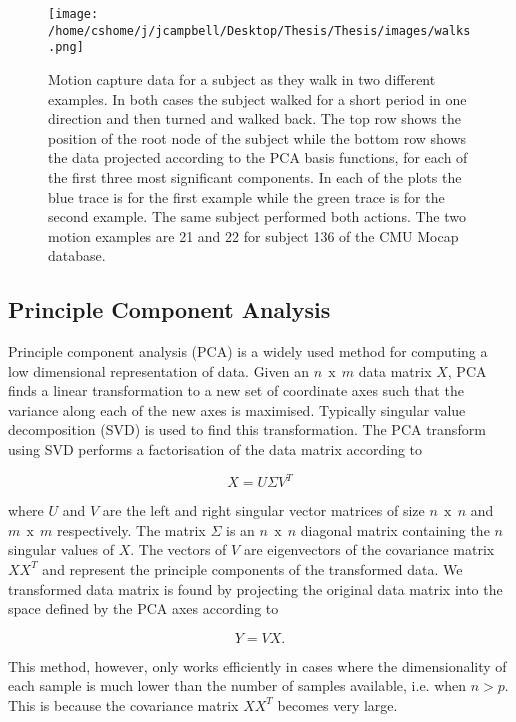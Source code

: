 \begin{figure}[h]
\texttt{[image: /home/cshome/j/jcampbell/Desktop/Thesis/Thesis/images/walks.png]}
\caption{Motion capture data for a subject as they walk in two different examples. In both cases the subject walked for a short period in one direction and then turned and walked back. The top row shows the position of the root node of the subject while the bottom row shows the data projected according to the PCA basis functions, for each of the first three most significant components. In each of the plots the blue trace is for the first example while the green trace is for the second example. The same subject performed both actions. The two motion examples are 21 and 22 for subject 136 of the CMU Mocap database. \label{walks}}
\end{figure}

\subsection{Principle Component Analysis}

Principle component analysis (PCA) is a widely used method for computing a low dimensional representation of data. Given an $n\:\:\text{x}\:\:m$ data matrix $X$, PCA finds a linear transformation to a new set of coordinate axes such that the variance along each of the new axes is maximised. Typically singular value decomposition (SVD) is used to find this transformation. The PCA transform using SVD performs a factorisation of the data matrix according to

\begin{equation}
X = U \Sigma V^{T} 
\end{equation}

\noindent where $U$ and $V$ are the left and right singular vector matrices of size $n\:\:\text{x}\:\:n$ and $m\:\:\text{x}\:\:m$ respectively. The matrix $\Sigma$ is an $n\:\:\text{x}\:\:n$ diagonal matrix containing the $n$ singular values of $X$. The vectors of $V$ are eigenvectors of the covariance matrix $X X^{T}$ and represent the principle components of the transformed data. We transformed data matrix is found by projecting the original data matrix into the space defined by the PCA axes according to

\begin{equation}
Y = V X. 
\label{PCA_compute}
\end{equation}

This method, however, only works efficiently in cases where the dimensionality of each sample is much lower than the number of samples available, i.e. when $n > p$. This is because the covariance matrix $X X^{T}$ becomes very large. \\

